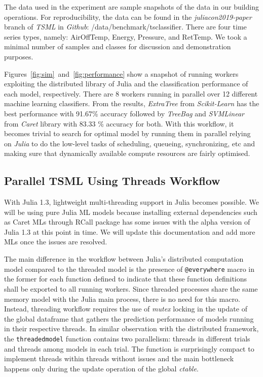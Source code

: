 \documentclass{juliacon}
\begin{document}
The data used in the experiment are sample snapshots of the data in our building operations. For reproducibility, the data can be found in the  \emph{juliacon2019-paper} branch of \emph{TSML} in \emph{Github}:  /data/benchmark/tsclassifier. There are four time series types, namely: AirOffTemp, Energy, Pressure, and RetTemp.  We  took a minimal number of samples and classes for discussion and demonstration purposes.

\vskip 6pt

Figures~\ref{fig:sim}~and~\ref{fig:performance}  show a snapshot of running workers exploiting the distributed library of Julia and the classification performance of each model, respectively. There are 8 workers running in parallel over 12 different machine learning classifiers. From the results, \emph{ExtraTree} from \emph{Scikit-Learn} has the best performance with 91.67\% accuracy followed by \emph{TreeBag} and \emph{SVMLinear} from \emph{Caret} library with 83.33 \% accuracy for both. With this workflow, it becomes trivial to search for optimal model by running them in parallel relying on \emph{Julia} to do the low-level tasks of scheduling, queueing, synchronizing, etc and making sure that dynamically available compute resources are fairly optimised.

\subsection{Parallel TSML Using Threads Workflow}
With Julia 1.3, lightweight multi-threading support in Julia becomes possible. We will be using pure Julia ML models because installing external dependencies such as Caret MLs through RCall package has some issues with the alpha version of Julia 1.3 at this point in time. We will update this documentation and add more MLs once the issues are resolved.

\vskip 6pt

The main difference in the workflow between Julia's distributed computation model compared to the threaded model is the presence of \texttt{@everywhere} macro in the former for each function defined to indicate that these function definitions shall be exported to all running workers. Since threaded processes share the same memory model with the Julia main process, there is no need for this macro. Instead, threading workflow requires the use of \emph{mutex} locking in the update of the global dataframe that gathers the prediction performance of models running in their respective threads. In similar observation with the distributed framework, the \texttt{threadedmodel} function contains two parallelism: threads in different trials and threads among models in each trial. The function is surprisingly compact to implement threads within threads without issues and the main bottleneck happens only during the update operation of the global \emph{ctable}.
\end{document}
